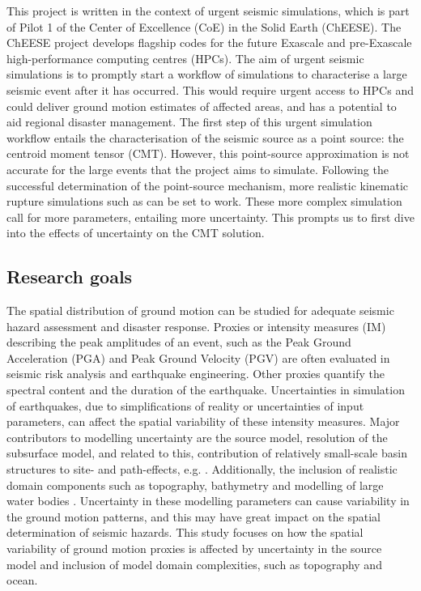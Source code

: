 \documentclass[../Text/00main.tex]{subfiles}
\begin{document}
This project is written in the context of urgent seismic simulations, which is part of Pilot 1 of the Center of Excellence (CoE) in the Solid Earth (ChEESE). The ChEESE project develops flagship codes for the future Exascale and pre-Exascale high-performance computing centres (HPCs). The aim of urgent seismic simulations is to promptly start a workflow of simulations to characterise a large seismic event after it has occurred. This would require urgent access to HPCs and could deliver ground motion estimates of affected areas, and has a potential to aid regional disaster management.  The first step of this urgent simulation workflow entails the characterisation of the seismic source as a point source: the centroid moment tensor (CMT). However, this point-source approximation is not accurate for the large events that the project aims to simulate. Following the successful determination of the point-source mechanism, more realistic kinematic rupture simulations such as \cite{graves_kinematic_2016} can be set to work. These more complex simulation call for more parameters, entailing more uncertainty. This prompts us to first dive into the effects of uncertainty on the CMT solution. 

\subsection{Research goals}

The spatial distribution of ground motion can be studied for adequate seismic hazard assessment and disaster response. Proxies or intensity measures (IM) describing the peak amplitudes of an event, such as the Peak Ground Acceleration (PGA) and Peak Ground Velocity (PGV) are often evaluated in seismic risk analysis and earthquake engineering. Other proxies quantify the spectral content and the duration of the earthquake. Uncertainties in simulation of earthquakes, due to simplifications of reality or uncertainties of input parameters, can affect the spatial variability of these intensity measures. Major contributors to modelling uncertainty are the source model, resolution of the subsurface model, and related to this, contribution of relatively small-scale basin structures to site- and path-effects, e.g. \cite{}. Additionally, the inclusion of realistic domain components such as topography, bathymetry and modelling of large water bodies \cite{afanasiev2019effect}. Uncertainty in these modelling parameters can cause variability in the ground motion patterns, and this may have great impact on the spatial determination of seismic hazards. This study focuses on how the spatial variability of ground motion proxies is affected by uncertainty in the source model and inclusion of model domain complexities, such as topography and ocean. 
\end{document}
